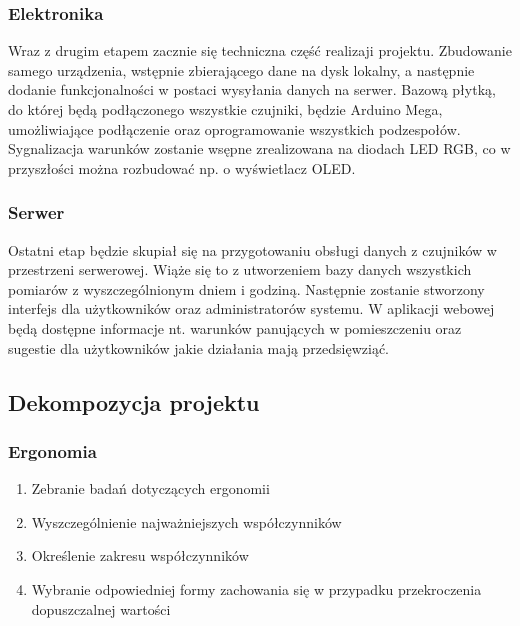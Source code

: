 \documentclass[10pt, a4paper]{article}
\begin{document}
\subsubsection{Elektronika}
Wraz z drugim etapem zacznie się techniczna część realizaji projektu. Zbudowanie samego urządzenia, wstępnie zbierającego dane na dysk lokalny, a następnie dodanie funkcjonalności w postaci wysyłania danych na serwer. Bazową płytką, do której będą podłączonego wszystkie czujniki, będzie Arduino Mega, umożliwiające podłączenie oraz oprogramowanie wszystkich podzespołów. Sygnalizacja warunków zostanie wsępne zrealizowana na diodach LED RGB, co w przyszłości można rozbudować np. o wyświetlacz OLED.

\subsubsection{Serwer}
Ostatni etap będzie skupiał się na przygotowaniu obsługi danych z czujników w przestrzeni serwerowej. Wiąże się to z utworzeniem bazy danych wszystkich pomiarów z wyszczególnionym dniem i godziną. Następnie zostanie stworzony interfejs dla użytkowników oraz administratorów systemu. W aplikacji webowej będą dostępne informacje nt. warunków panujących w pomieszczeniu oraz sugestie dla użytkowników jakie działania mają przedsięwziąć.

\subsection{Dekompozycja projektu}

\subsubsection{Ergonomia}
\begin{enumerate}
\item Zebranie badań dotyczących ergonomii
\item Wyszczególnienie najważniejszych współczynników
\item Określenie zakresu współczynników
\item Wybranie odpowiedniej formy zachowania się w przypadku przekroczenia dopuszczalnej wartości
\end{enumerate}
\end{document}
